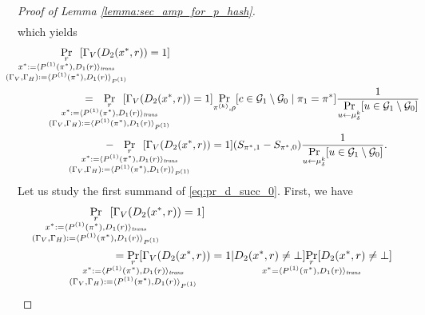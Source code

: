 \begin{proof}[Proof of Lemma \ref{lemma:sec_amp_for_p_hash}]
\begin{align*}
\end{align*}
%
which yields
\begin{align}
\label{eq:pr_d_succ_0}
&\IndII\underset{
  \mathclap{
    \substack{r \\ x^* := \langle P^{(1)}(\pi^*), D_1(r) \rangle_{\mathit{trans}} \\ (\Gamma_V, \Gamma_H) := \langle P^{(1)}(\pi^*), D_1(r) \rangle_{P^{(1)}} }}}
{\Pr}\mkern13mu[\Gamma_V(D_2(x^*, r)) = 1] \notag\\
%
&\IndIII = \mkern13mu
  \underset{
    \mathclap{
      \substack{r \\ x^* := \langle P^{(1)}(\pi^*), D_1 (r) \rangle_{\mathit{trans}} \\ (\Gamma_V, \Gamma_H) := \langle P^{(1)}(\pi^*), D_1 (r) \rangle_{P^{(1)}} }}}
  {\Pr}\mkern13mu[\Gamma_V(D_2(x^*, r)) = 1]
  \underset{\pi^{(k)},\rho}{\Pr}[c \in \cG_1 \setminus \cG_0 \mid \pi_1 = \pi^*]
\frac{1}{\underset{u \leftarrow \mu_{\delta}^k}{\Pr}[ u \in \cG_1 \setminus \cG_0]}\notag\\
%
&\IndIIII - \mkern13mu
\underset{
  \mathclap{
  \substack{r \\ x^* := \langle P^{(1)}(\pi^*), D_1(r) \rangle_{\mathit{trans}} \\ (\Gamma_V, \Gamma_H) := \langle P^{(1)}(\pi^*), D_1(r) \rangle_{P^{(1)}} }}}
{\Pr}\mkern13mu[\Gamma_V(D_2(x^*, r)) = 1](S_{\pi^*,1} - S_{\pi^*,0})
\frac{1}{\underset{u \leftarrow \mu_{\delta}^k}{\Pr}[ u \in \cG_1 \setminus\cG_0]}.
\end{align}
Let us study the first summand of \eqref{eq:pr_d_succ_0}. First, we have
\begin{align}
  \label{eq:pr_gamma_v_0}
  \IndII &\underset{
    \mathclap{
      \substack{r \\
        x^* := \langle P^{(1)}(\pi^*), D_1 (r) \rangle_{\mathit{trans}} \\
        (\Gamma_V, \Gamma_H) := \langle P^{(1)}(\pi^*), D_1(r) \rangle_{P^{(1)}} }}}
  {\Pr}\mkern13mu[\Gamma_V(D_2(x^*, r)) = 1] \notag\\
  &\IndI = \underset{
    \mathclap{
      \substack{r \\
        x^* := \langle P^{(1)}(\pi^*), D_1 (r) \rangle_{\mathit{trans}} \\
        (\Gamma_V, \Gamma_H) := \langle P^{(1)}(\pi^*), D_1(r) \rangle_{P^{(1)}} }}}
  {\Pr}[\Gamma_V(D_2(x^*, r)) = 1 | D_2(x^*,r) \neq \bot]
  \underset{\mathclap{\substack{r \\ x^* = \langle P^{(1)}(\pi^*), D_1(r) \rangle_{\mathit{trans}}}}}{\Pr}[D_2(x^*,r) \neq \bot] \notag\\

\end{align}
\end{proof}
